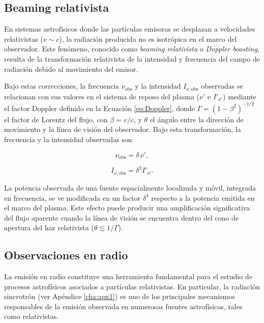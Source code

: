 \subsection{Beaming relativista}\label{sec:Beaming}

	En sistemas astrofísicos donde las partículas emisoras se desplazan a velocidades relativistas ($v \sim c$), la radiación producida no es isotrópica en el marco del observador. Este fenómeno, conocido como \textit{beaming relativista} o \textit{Doppler boosting}, resulta de la transformación relativista de la intensidad y frecuencia del campo de radiación debido al movimiento del emisor.

Bajo estas correcciones, la frecuencia $\nu_{\text{obs}}$ y la intensidad $I_{\nu,\text{obs}}$ observadas se relacionan con sus valores en el sistema de reposo del plasma ($\nu'$ e $I'_{\nu'}$) mediante el factor Doppler definido en la Ecuaci\'on \eqref{eq:Doppler}, donde $\Gamma = (1 - \beta^2)^{-1/2}$ el factor de Lorentz del flujo, con $\beta = v/c$, y $\theta$ el ángulo entre la dirección de movimiento y la línea de visión del observador. Bajo esta transformación, la frecuencia y la intensidad observadas son

\begin{equation}\label{eq:marco-10}
	\nu_{\text{obs}} = \delta\,\nu',
\end{equation}

\begin{equation}\label{eq:marco-11}
	I_{\nu,\text{obs}} = \delta^3 I'_{\nu'}.
\end{equation}

	La potencia observada de una fuente espacialmente localizada y móvil, integrada en frecuencia, se ve modificada en un factor $\delta^4$ respecto a la potencia emitida en el marco del plasma.
	Este efecto puede producir una amplificación significativa del flujo aparente cuando la línea de visión se encuentra dentro del cono de apertura del haz relativista ($\theta \lesssim 1/\Gamma$).
	
\subsection{Observaciones en radio}\label{ssec:ObsRadio}

	La emisión en radio constituye una herramienta fundamental para el estudio de procesos astrofísicos asociados a partículas relativistas. 
	En particular, la radiación sincrotrón (ver Apéndice \ref{cha:apx1}) es uno de los principales mecanismos responsables de la emisión observada en numerosas fuentes astrofísicas, tales como \jets relativistas.

